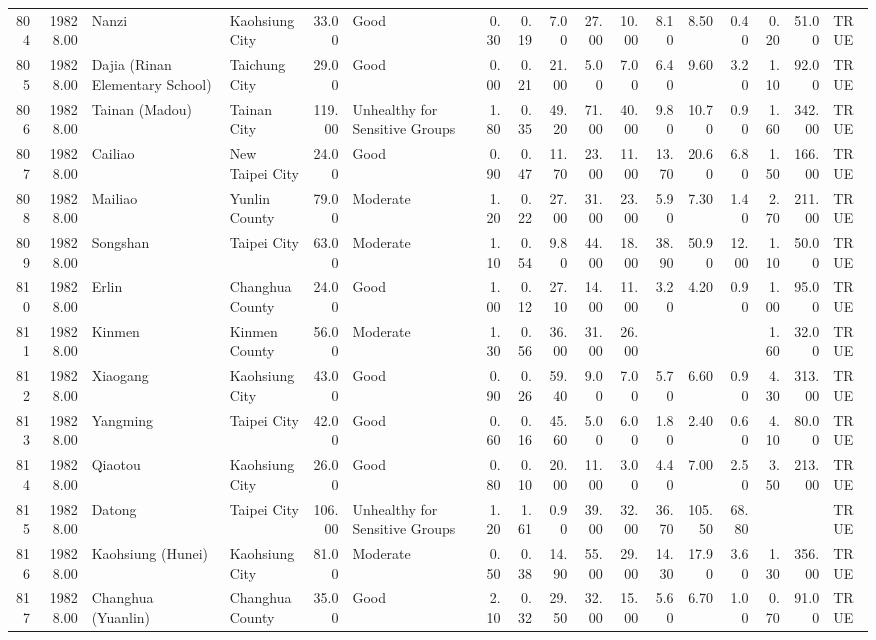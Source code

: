 \begin{table}[ht]
\begin{tabular}{rrllrlrrrrrrrrrrl}
  804 & 19828.00 & Nanzi & Kaohsiung City & 33.00 & Good & 0.30 & 0.19 & 7.00 & 27.00 & 10.00 & 8.10 & 8.50 & 0.40 & 0.20 & 51.00 & TRUE \\ 
  805 & 19828.00 & Dajia (Rinan Elementary School) & Taichung City & 29.00 & Good & 0.00 & 0.21 & 21.00 & 5.00 & 7.00 & 6.40 & 9.60 & 3.20 & 1.10 & 92.00 & TRUE \\ 
  806 & 19828.00 & Tainan (Madou) & Tainan City & 119.00 & Unhealthy for Sensitive Groups & 1.80 & 0.35 & 49.20 & 71.00 & 40.00 & 9.80 & 10.70 & 0.90 & 1.60 & 342.00 & TRUE \\ 
  807 & 19828.00 & Cailiao & New Taipei City & 24.00 & Good & 0.90 & 0.47 & 11.70 & 23.00 & 11.00 & 13.70 & 20.60 & 6.80 & 1.50 & 166.00 & TRUE \\ 
  808 & 19828.00 & Mailiao & Yunlin County & 79.00 & Moderate & 1.20 & 0.22 & 27.00 & 31.00 & 23.00 & 5.90 & 7.30 & 1.40 & 2.70 & 211.00 & TRUE \\ 
  809 & 19828.00 & Songshan & Taipei City & 63.00 & Moderate & 1.10 & 0.54 & 9.80 & 44.00 & 18.00 & 38.90 & 50.90 & 12.00 & 1.10 & 50.00 & TRUE \\ 
  810 & 19828.00 & Erlin & Changhua County & 24.00 & Good & 1.00 & 0.12 & 27.10 & 14.00 & 11.00 & 3.20 & 4.20 & 0.90 & 1.00 & 95.00 & TRUE \\ 
  811 & 19828.00 & Kinmen & Kinmen County & 56.00 & Moderate & 1.30 & 0.56 & 36.00 & 31.00 & 26.00 &  &  &  & 1.60 & 32.00 & TRUE \\ 
  812 & 19828.00 & Xiaogang & Kaohsiung City & 43.00 & Good & 0.90 & 0.26 & 59.40 & 9.00 & 7.00 & 5.70 & 6.60 & 0.90 & 4.30 & 313.00 & TRUE \\ 
  813 & 19828.00 & Yangming & Taipei City & 42.00 & Good & 0.60 & 0.16 & 45.60 & 5.00 & 6.00 & 1.80 & 2.40 & 0.60 & 4.10 & 80.00 & TRUE \\ 
  814 & 19828.00 & Qiaotou & Kaohsiung City & 26.00 & Good & 0.80 & 0.10 & 20.00 & 11.00 & 3.00 & 4.40 & 7.00 & 2.50 & 3.50 & 213.00 & TRUE \\ 
  815 & 19828.00 & Datong & Taipei City & 106.00 & Unhealthy for Sensitive Groups & 1.20 & 1.61 & 0.90 & 39.00 & 32.00 & 36.70 & 105.50 & 68.80 &  &  & TRUE \\ 
  816 & 19828.00 & Kaohsiung (Hunei) & Kaohsiung City & 81.00 & Moderate & 0.50 & 0.38 & 14.90 & 55.00 & 29.00 & 14.30 & 17.90 & 3.60 & 1.30 & 356.00 & TRUE \\ 
  817 & 19828.00 & Changhua (Yuanlin) & Changhua County & 35.00 & Good & 2.10 & 0.32 & 29.50 & 32.00 & 15.00 & 5.60 & 6.70 & 1.00 & 0.70 & 91.00 & TRUE \\ 

\end{tabular}
\end{table}
